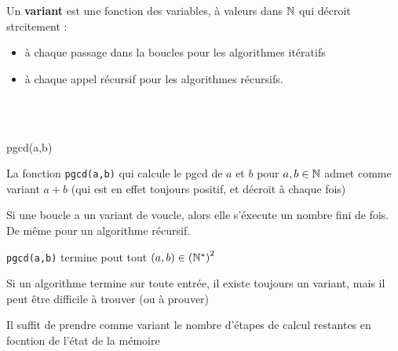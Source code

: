 \begin{definition}
	Un \textbf{variant} est une fonction des variables, à valeurs dans $\mathbb{N}$ qui décroit strcitement :
	\begin{itemize}
		\item à chaque passage dans la boucles pour les algorithmes itératifs
		\item à chaque appel récursif pour les algorithmes récursifs.
	\end{itemize}
\end{definition}

\begin{example} \enspace \\ \\ \label{1-2}
	\begin{minipage}{0.5 \linewidth}
		\begin{algorithm}[H]
			\caption{pgcd(a,b)}
		\end{algorithm}
	\end{minipage} \quad \begin{minipage}{0.4 \linewidth}
		La fonction \texttt{pgcd(a,b)} qui calcule le pgcd de $a$ et $b$ pour $a, b \in \mathbb{N}$ admet comme variant $a+b$ (qui est en effet toujours positif, et décroit à chaque fois)
	\end{minipage}
\end{example}

\begin{proposition}
	\label{1-1}
	Si une boucle a un variant de voucle, alors elle s'éxecute un nombre fini de fois. De même pour un algorithme récursif.
\end{proposition}

\begin{example}
	\texttt{pgcd(a,b)} termine pout tout $(a,b)\in \left(\mathbb{N}^*\right)^2$
\end{example}

\begin{rem}
	Si un algorithme termine sur toute entrée, il existe toujours un variant, mais il peut être difficile à trouver (ou à prouver)
\end{rem}

\begin{com}
	Il suffit de prendre comme variant le nombre d'étapes de calcul restantes en focntion de l'état de la mémoire
\end{com}

